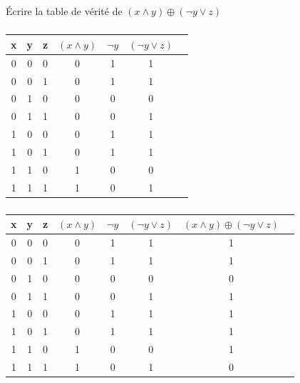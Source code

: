 \documentclass[svgnames,11pt]{beamer}
\begin{document}
\begin{frame}
    \frametitle{}

    \begin{activite}
    Écrire la table de vérité de $(x\land y)\oplus (\lnot y \lor z)$
    \end{activite}

\end{frame}
\begin{frame}
    \frametitle{}

    \begin{center}
        \begin{tabular}{|*7{c|}}
        \hline 
        x & y & z & $(x\land y)$ & $\lnot y$ & $(\lnot y \lor z)$\\ 
        \hline 
0 & 0 & 0 &0&1&1\\
\hline 
0 & 0 & 1 &0&1&1\\
\hline 
0 & 1 & 0 &0&0&0\\
\hline 
0 & 1 & 1 &0&0&1\\
\hline 
1 & 0 & 0 &0&1&1\\
\hline 
1 & 0 & 1 &0&1&1\\
\hline 
1 & 1 & 0 &1&0&0\\
\hline 
1 & 1 & 1 &1&0&1\\
\hline
        \end{tabular}
        \end{center}

\end{frame}
\begin{frame}
    \frametitle{}

    \begin{center}
        \begin{tabular}{|*8{c|}}
        \hline 
        x & y & z & $(x\land y)$ & $\lnot y$ & $(\lnot y \lor z)$&$(x\land y)\oplus (\lnot y \lor z)$\\ 
        \hline 
0 & 0 & 0 &0&1&1&1\\
\hline 
0 & 0 & 1 &0&1&1&1\\
\hline 
0 & 1 & 0 &0&0&0&0\\
\hline 
0 & 1 & 1 &0&0&1&1\\
\hline 
1 & 0 & 0 &0&1&1&1\\
\hline 
1 & 0 & 1 &0&1&1&1\\
\hline 
1 & 1 & 0 &1&0&0&1\\
\hline 
1 & 1 & 1 &1&0&1&0\\
\hline
        \end{tabular}
        \end{center}

\end{frame}
\end{document}
